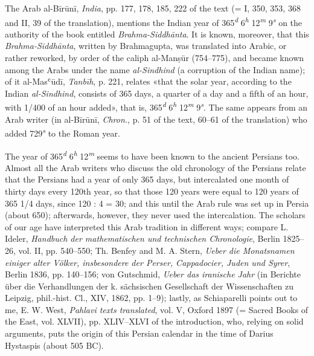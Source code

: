 \documentclass[11pt]{article}
\begin{document}
\par The Arab al-Bīrūnī, \emph{India}, pp. 177, 178, 185, 222 of the text (= I, 350, 353, 368 and II, 39 of the translation), mentions the Indian year of 365\textsuperscript{\itshape d} 6\textsuperscript{\itshape h} 12\textsuperscript{\itshape m} 9\textsuperscript{\itshape s} on the authority of the book entitled \emph{Brahma-Siddhānta}. It is known, moreover, that this \emph{Brahma-Siddhānta}, written by Brahmagupta, was translated into Arabic, or rather reworked, by order of the caliph al-Manṣūr (754–775), and became known among the Arabs under the name \emph{al-Sindhind} (a corruption of the Indian name); of it al-Masʿūdī, \emph{Tanbīh}, p. 221, relates «that the solar year, according to the Indian \emph{al-Sindhind}, consists of 365 days, a quarter of a day and a fifth of an hour, with 1/400 of an hour added», that is, 365\textsuperscript{\itshape d} 6\textsuperscript{\itshape h} 12\textsuperscript{\itshape m} 9\textsuperscript{\itshape s}. The same appears from an Arab writer (in al-Bīrūnī, \emph{Chron.}, p. 51 of the text, 60–61 of the translation) who added 729\textsuperscript{\itshape s} to the Roman year.\par
\par The year of 365\textsuperscript{\itshape d} 6\textsuperscript{\itshape h} 12\textsuperscript{\itshape m} seems to have been known to the ancient Persians too. Almost all the Arab writers who discuss the old chronology of the Persians relate that the Persians had a year of only 365 days, but intercalated one month of thirty days every 120th year, so that those 120 years were equal to 120 years of 365 1/4 days, since 120 : 4 = 30; and this until the Arab rule was set up in Persia (about 650); afterwards, however, they never used the intercalation. The scholars of our age have interpreted this Arab tradition in different ways; compare L. Ideler, \emph{Handbuch der mathematischen und technischen Chronologie}, Berlin 1825–26, vol. II, pp. 540–550; Th. Benfey and M. A. Stern, \emph{Ueber die Monatsnamen einiger alter Völker, insbesondere der Perser, Cappadocier, Juden und Syrer}, Berlin 1836, pp. 140–156; von Gutschmid, \emph{Ueber das iranische Jahr} (in Berichte über die Verhandlungen der k. sächsischen Gesellschaft der Wissenschaften zu Leipzig, phil.-hist. Cl., XIV, 1862, pp. 1–9); lastly, as Schiaparelli points out to me, E. W. West, \emph{Pahlavi texts translated}, vol. V, Oxford 1897 (= Sacred Books of the East, vol. XLVII), pp. XLIV–XLVI of the introduction, who, relying on solid arguments, puts the origin of this Persian calendar in the time of Darius Hystaspis (about 505 BC).\par
\end{document}
